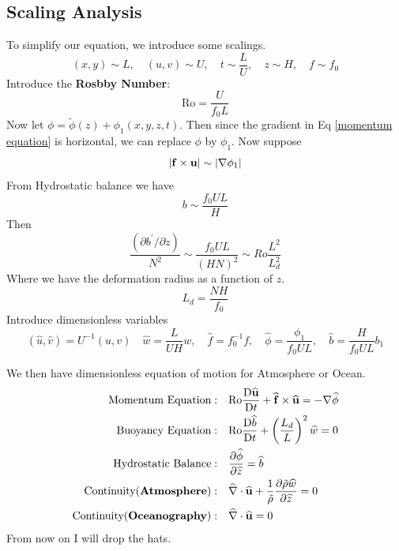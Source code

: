 \documentclass[../SQG_notes.tex]{subfiles}
\begin{document}
    \subsection{Scaling Analysis}
    To simplify our equation, we introduce some scalings. 
    \[
    (x, y) \sim L, \quad(u, v) \sim U, \quad t \sim \frac{L}{U}, \quad z \sim H, \quad f \sim f_0
    \]
    Introduce the \textbf{Rosbby Number}:
    \begin{equation}
        \text{Ro} = \frac{U}{f_0 L}
    \end{equation}
    Now let $\phi = \tilde{\phi}(z) + \phi_1(x,y,z,t)$. Then since the gradient in Eq \ref{momentum equation} is horizontal, we can replace $\phi$ by $\phi_1$. Now suppose  
    \[
    |\mathbf{f} \times \mathbf{u}| \sim\left|\nabla \phi_1\right|
    \]
    From Hydrostatic balance we have 
    \[ b \sim \frac{f_0 UL}{H}\]
    Then 
    \[
    \frac{\left(\partial b^{\prime} / \partial z\right)}{N^2}\sim \frac{f_0 UL}{(HN)^2} \sim R o \frac{L^2}{L_d^2}
    \]
    Where we have the deformation radius as a function of $z$. 
    \[ L_d = \frac{NH}{f_0}\]
    Introduce dimensionless variables
    \[
(\widehat{u}, \widehat{v})=U^{-1}(u, v) \quad \widehat{w}=\frac{L}{U H} w, \quad \widehat{f}=f_0^{-1} f, \quad \widehat{\phi}=\frac{\phi_1}{f_0 U L}, \quad \widehat{b}=\frac{H}{f_0 U L} b_1
    \]
    \begin{remark}
    We then have dimensionless equation of motion for Atmosphere or Ocean.  
        \begin{align}
            \text{Momentum Equation} :\quad & \text{Ro} \frac{\mathrm{D} \widehat{\mathbf{u}}}{\mathrm{D} t} + \widehat{\mathbf{f}} \times \widehat{\mathbf{u}} = -\nabla \widehat{\phi} \label{dimensionless momentum equation} \\
            \text{Buoyancy Equation} :\quad& \text{Ro} \frac{\mathrm{D} \widehat{b}}{\mathrm{D} t} + \left(\frac{L_d}{L}\right)^2 \widehat{w} = 0 \label{dimensionless buoyancy equation}\\
            \text{Hydrostatic Balance}:\quad & \frac{\partial \widehat{\phi}}{\partial \widehat{z}} = \widehat{b} \label{dimensionless hydrostatic balance equation}\\
            \text{Continuity(\textbf{Atmosphere})} :\quad& \widehat{\nabla} \cdot \widehat{\mathbf{u}} + \frac{1}{\tilde{\rho}} \frac{\partial \tilde{\rho} \widehat{w}}{\partial \widehat{z}} = 0 \label{dimensionless continuity equation for atmosphere}\\ 
            \text{Continuity(\textbf{Oceanography})} : \quad& \widehat{\nabla} \cdot \widehat{\mathbf{u}} = 0 \label{dimensionless contiuity equation for ocean}
        \end{align}
        From now on I will drop the hats.
    \end{remark}
\end{document}
